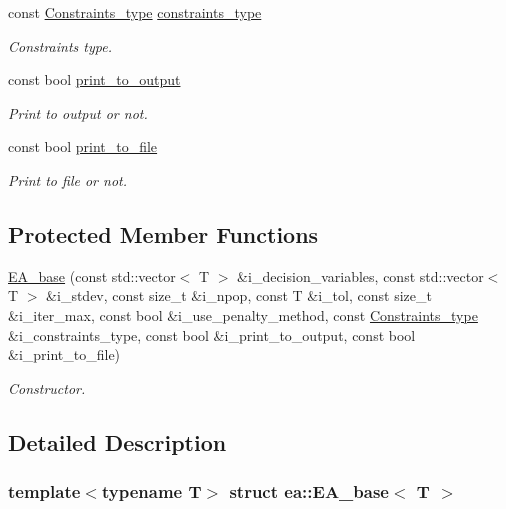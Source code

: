 \begin{DoxyCompactItemize}
const \hyperlink{namespaceutilities_ab1a1517bf6e62a1acfab5293ca8985c1}{Constraints\+\_\+type} \hyperlink{structea_1_1_e_a__base_a8f6f21a54d24fa69833cfd1a59beeed3}{constraints\+\_\+type}
\begin{DoxyCompactList}\small\item\em Constraints type. \end{DoxyCompactList}\item 
const bool \hyperlink{structea_1_1_e_a__base_aea758485e2120469ca02c52c7cff9e5a}{print\+\_\+to\+\_\+output}
\begin{DoxyCompactList}\small\item\em Print to output or not. \end{DoxyCompactList}\item 
const bool \hyperlink{structea_1_1_e_a__base_a9ad71465eab92ffd0fe98b625d2d15bc}{print\+\_\+to\+\_\+file}
\begin{DoxyCompactList}\small\item\em Print to file or not. \end{DoxyCompactList}\end{DoxyCompactItemize}
\subsection*{Protected Member Functions}
\begin{DoxyCompactItemize}
\item 
\hyperlink{structea_1_1_e_a__base_a4dd8bb67732d28ba3d084ddcd6ee1858}{E\+A\+\_\+base} (const std\+::vector$<$ T $>$ \&i\+\_\+decision\+\_\+variables, const std\+::vector$<$ T $>$ \&i\+\_\+stdev, const size\+\_\+t \&i\+\_\+npop, const T \&i\+\_\+tol, const size\+\_\+t \&i\+\_\+iter\+\_\+max, const bool \&i\+\_\+use\+\_\+penalty\+\_\+method, const \hyperlink{namespaceutilities_ab1a1517bf6e62a1acfab5293ca8985c1}{Constraints\+\_\+type} \&i\+\_\+constraints\+\_\+type, const bool \&i\+\_\+print\+\_\+to\+\_\+output, const bool \&i\+\_\+print\+\_\+to\+\_\+file)
\begin{DoxyCompactList}\small\item\em Constructor. \end{DoxyCompactList}\end{DoxyCompactItemize}


\subsection{Detailed Description}
\subsubsection*{template$<$typename T$>$\newline
struct ea\+::\+E\+A\+\_\+base$<$ T $>$}

